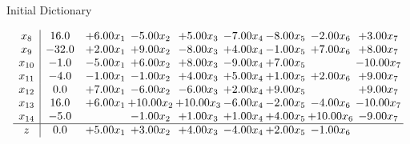 \documentclass[8pt]{article}
\begin{document}
Initial Dictionary 

\[\begin{array}{c| c c@{\hskip 2pt} c@{\hskip 2pt} c@{\hskip 2pt} c@{\hskip 2pt} c@{\hskip 2pt} c@{\hskip 2pt} c@{\hskip 2pt} }
 x_{8}   &  16.0 & +  6.00 x_{1} & -5.00 x_{2} & +  5.00 x_{3} & -7.00 x_{4} & -8.00 x_{5} & -2.00 x_{6} & +  3.00 x_{7}\\
 x_{9}   &  -32.0 & +  2.00 x_{1} & +  9.00 x_{2} & -8.00 x_{3} & +  4.00 x_{4} & -1.00 x_{5} & +  7.00 x_{6} & +  8.00 x_{7}\\
 x_{10}   &  -1.0 & -5.00 x_{1} & +  6.00 x_{2} & +  8.00 x_{3} & -9.00 x_{4} & +  7.00 x_{5} &   & -10.00 x_{7}\\
 x_{11}   &  -4.0 & -1.00 x_{1} & -1.00 x_{2} & +  4.00 x_{3} & +  5.00 x_{4} & +  1.00 x_{5} & +  2.00 x_{6} & +  9.00 x_{7}\\
 x_{12}   &  0.0 & +  7.00 x_{1} & -6.00 x_{2} & -6.00 x_{3} & +  2.00 x_{4} & +  9.00 x_{5} &   & +  9.00 x_{7}\\
 x_{13}   &  16.0 & +  6.00 x_{1} & + 10.00 x_{2} & + 10.00 x_{3} & -6.00 x_{4} & -2.00 x_{5} & -4.00 x_{6} & -10.00 x_{7}\\
 x_{14}   &  -5.0  &   & -1.00 x_{2} & +  1.00 x_{3} & +  1.00 x_{4} & +  4.00 x_{5} & + 10.00 x_{6} & -9.00 x_{7}\\
\hline
z    &  0.0 & +  5.00 x_{1} & +  3.00 x_{2} & +  4.00 x_{3} & -4.00 x_{4} & +  2.00 x_{5} & -1.00 x_{6} &   \\
\end{array}\]
\end{document}
